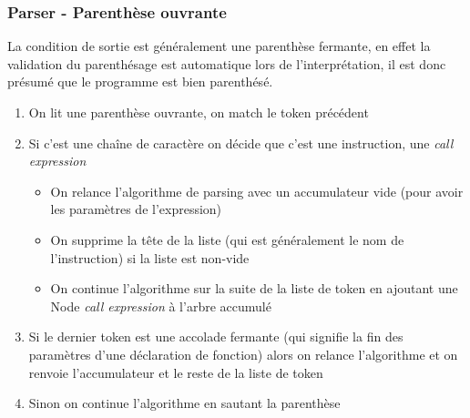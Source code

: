 \documentclass{beamer}
\begin{document}
    \begin{frame}
        \frametitle{Parser - Parenthèse ouvrante}
        La condition de sortie est généralement une parenthèse fermante, en effet la validation du parenthésage est automatique lors de l'interprétation,
        il est donc présumé que le programme est bien parenthésé.
        \begin{enumerate}
            \item<1> On lit une parenthèse ouvrante, on match le token précédent
            \item<2> Si c'est une chaîne de caractère on décide que c'est une instruction, une \textit{call expression}
            \begin{itemize}
                \item<3> On relance l'algorithme de parsing avec un accumulateur vide (pour avoir les paramètres de l'expression)
                \item<4> On supprime la tête de la liste (qui est généralement le nom de l'instruction) si la liste est non-vide 
                \item<5> On continue l'algorithme sur la suite de la liste de token en ajoutant une Node \textit{call expression} à l'arbre accumulé
            \end{itemize}
            \item<6> Si le dernier token est une accolade fermante (qui signifie la fin des paramètres d'une déclaration de fonction) alors on 
            relance l'algorithme et on renvoie l'accumulateur et le reste de la liste de token
            \item<7> Sinon on continue l'algorithme en sautant la parenthèse
        \end{enumerate} 
    \end{frame}
\end{document}
